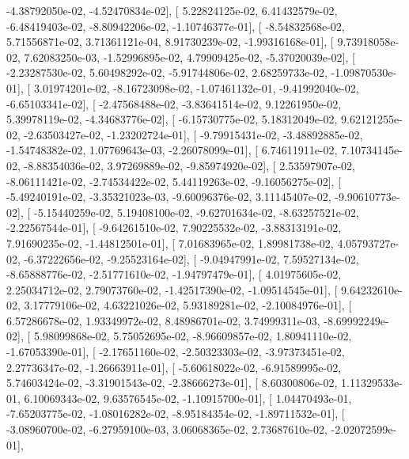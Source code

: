 \documentclass{article}
\begin{document}
         -4.38792050e-02,  -4.52470834e-02],
       [  5.22824125e-02,   6.41432579e-02,  -6.48419403e-02,
         -8.80942206e-02,  -1.10746377e-01],
       [ -8.54832568e-02,   5.71556871e-02,   3.71361121e-04,
          8.91730239e-02,  -1.99316168e-01],
       [  9.73918058e-02,   7.62083250e-03,  -1.52996895e-02,
          4.79909425e-02,  -5.37020039e-02],
       [ -2.23287530e-02,   5.60498292e-02,  -5.91744806e-02,
          2.68259733e-02,  -1.09870530e-01],
       [  3.01974201e-02,  -8.16723098e-02,  -1.07461132e-01,
         -9.41992040e-02,  -6.65103341e-02],
       [ -2.47568488e-02,  -3.83641514e-02,   9.12261950e-02,
          5.39978119e-02,  -4.34683776e-02],
       [ -6.15730775e-02,   5.18312049e-02,   9.62121255e-02,
         -2.63503427e-02,  -1.23202724e-01],
       [ -9.79915431e-02,  -3.48892885e-02,  -1.54748382e-02,
          1.07769643e-03,  -2.26078099e-01],
       [  6.74611911e-02,   7.10734145e-02,  -8.88354036e-02,
          3.97269889e-02,  -9.85974920e-02],
       [  2.53597907e-02,  -8.06111421e-02,  -2.74534422e-02,
          5.44119263e-02,  -9.16056275e-02],
       [ -5.49240191e-02,  -3.35321023e-03,  -9.60096376e-02,
          3.11145407e-02,  -9.90610773e-02],
       [ -5.15440259e-02,   5.19408100e-02,  -9.62701634e-02,
         -8.63257521e-02,  -2.22567544e-01],
       [ -9.64261510e-02,   7.90225532e-02,  -3.88313191e-02,
          7.91690235e-02,  -1.44812501e-01],
       [  7.01683965e-02,   1.89981738e-02,   4.05793727e-02,
         -6.37222656e-02,  -9.25523164e-02],
       [ -9.04947991e-02,   7.59527134e-02,  -8.65888776e-02,
         -2.51771610e-02,  -1.94797479e-01],
       [  4.01975605e-02,   2.25034712e-02,   2.79073760e-02,
         -1.42517390e-02,  -1.09514545e-01],
       [  9.64232610e-02,   3.17779106e-02,   4.63221026e-02,
          5.93189281e-02,  -2.10084976e-01],
       [  6.57286678e-02,   1.93349972e-02,   8.48986701e-02,
          3.74999311e-03,  -8.69992249e-02],
       [  5.98099868e-02,   5.75052695e-02,  -8.96609857e-02,
          1.80941110e-02,  -1.67053390e-01],
       [ -2.17651160e-02,  -2.50323303e-02,  -3.97373451e-02,
          2.27736347e-02,  -1.26663911e-01],
       [ -5.60618022e-02,  -6.91589995e-02,   5.74603424e-02,
         -3.31901543e-02,  -2.38666273e-01],
       [  8.60300806e-02,   1.11329533e-01,   6.10069343e-02,
          9.63576545e-02,  -1.10915700e-01],
       [  1.04470493e-01,  -7.65203775e-02,  -1.08016282e-02,
         -8.95184354e-02,  -1.89711532e-01],
       [ -3.08960700e-02,  -6.27959100e-03,   3.06068365e-02,
          2.73687610e-02,  -2.02072599e-01],
\end{document}
